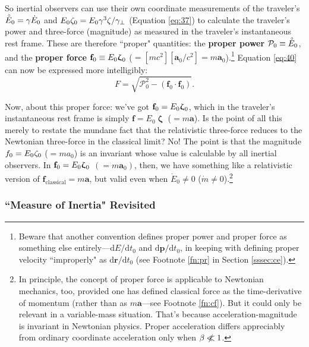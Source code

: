 \documentclass[12pt]{article}
\renewcommand{\mathring}[1]{\accentset{\circ}{#1}}
\renewcommand{\vv}[1]{\mathbf{#1}}
\newcommand{\dd}[1]{\mathrm{d}#1}
\newcommand{\vvzeta}{\bm{\upzeta}}
\begin{document}
So inertial observers can use their own coordinate measurements of the traveler's $\mathring{E}_0 = \gamma \dot{E}_0$ and $E_0 \mkern.5mu \zeta_0 = E_0 \gamma^3 \zeta / \gamma_{\perp}$ (Equation \ref{eq:37}) to calculate the traveler's power and three-force (magnitude) as measured in the traveler's instantaneous rest frame. These are therefore ``proper" quantities: the \textbf{proper power} $\mathcal{P}_0 \equiv \mathring{E}_0$, and the \textbf{proper force} $\vv f_0 \equiv E_0 \vvzeta_{\mkern1mu 0}$ ($= [mc^2][\vv a_0 / c^2] = m \vv a_0$).\footnote{Beware that another convention defines proper power and proper force as something else entirely---$\dd E / \dd t_0$ and $\dd \vv p / \dd t_0$, in keeping with defining proper velocity ``improperly" as $\dd \vv r / \dd t_0$ (see Footnote \ref{fn:pr} in Section \ref{sssec:ce}).} Equation \ref{eq:40} can now be expressed more intelligibly:
\begin{equation}\label{eq:42}
F = \sqrt{\mathcal{P}_0^2 - (\vv f_0 \cdot \vv f_0)} .
\end{equation}

Now, about this proper force: we've got $\vv f_0 = E_0 \vvzeta_{\mkern1mu 0}$, which in the traveler's instantaneous rest frame is simply $\vv f = E_0 \vvzeta$ ($= m \vv a$). Is the point of all this merely to restate the mundane fact that the relativistic three-force reduces to the Newtonian three-force in the classical limit? No! The point is that the magnitude $f_0 = E_0 \mkern.5mu \zeta_0$ ($= m a_0$) is an invariant whose value is calculable by all inertial observers. In $\vv f_0 = E_0 \vvzeta_{\mkern1mu 0}$ $(= m \vv a_0)$, then, we have something like a relativistic version of $\vv f_{\mathrm{classical}} = m \vv a$, but valid even when $\dot{E}_0 \neq 0$ ($\dot{m} \neq 0$).\footnote{In principle, the concept of proper force is applicable to Newtonian mechanics, too, provided one has defined classical force as the time-derivative of momentum (rather than as $m \vv a$---see Footnote \ref{fn:cf}). But it could only be relevant in a variable-mass situation. That's because acceleration-magnitude is invariant in Newtonian physics. Proper acceleration differs appreciably from ordinary coordinate acceleration only when $\beta \centernot{\ll} 1$.}


\subsubsection[“Measure of Inertia” Revisited]{``Measure of Inertia" Revisited}\label{ssec:in}
\end{document}
